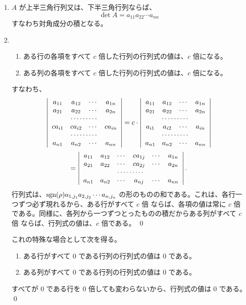 \begin{enumerate}
\item $A$ が上半三角行列又は、下半三角行列ならば、
$$\det A = a_{11}a_{22}\cdots a_{nn}$$
すなわち対角成分の積となる。

\item \begin{enumerate}
	\item ある行の各項をすべて $c$ 倍した行列の行列式の値は、$c$ 倍になる。
	\item ある列の各項をすべて $c$ 倍した行列の行列式の値は、$c$ 倍になる。
	\end{enumerate}
	すなわち、{\small
	$$\left|\begin{array}{cccc}a_{11} & a_{12} & \cdots & a_{1n} \\
a_{21} & a_{22} & \cdots & a_{2n}\\
\multicolumn{4}{c}{\cdots\cdots\cdots}\\
ca_{i1} & ca_{i2} & \cdots & ca_{in}\\
\multicolumn{4}{c}{\cdots\cdots\cdots}\\
a_{n1} & a_{n2} & \cdots & a_{nn}
\end{array}\right| = 
c\cdot\left|\begin{array}{cccc}a_{11} & a_{12} & \cdots & a_{1n} \\
a_{21} & a_{22} & \cdots & a_{2n}\\
\multicolumn{4}{c}{\cdots\cdots\cdots}\\
a_{i1} & a_{i2} & \cdots & a_{in}\\
\multicolumn{4}{c}{\cdots\cdots\cdots}\\
a_{n1} & a_{n2} & \cdots & a_{nn}
\end{array}\right|$$
$$ = \left|\begin{array}{cccccc}a_{11} & a_{12} & \cdots & ca_{1j} & \cdots & a_{1n} \\
a_{21} & a_{22} &  \cdots & ca_{2j} & \cdots & a_{2n} \\
\multicolumn{6}{c}{\cdots\cdots\cdots}\\
a_{n1} & a_{n2} & \cdots & a_{nj} & \cdots & a_{nn}
\end{array}\right|.$$
}%
	\proof
	行列式は、$\mbox{{\rm sgn}}(\rho)a_{1,j_1}a_{2,j_2}\cdots a_{n,j_n}$ の形のものの和である。これは、各行一つずつ必ず現れるから、ある行がすべて $c$ 倍 ならば、各項の値は常に $c$ 倍 である。同様に、各列から一つずつとったものの積だからある列がすべて $c$ 倍  ならば、行列式の値は、$c$ 倍である。
	\qed

\smallskip
これの特殊な場合として次を得る。
	\begin{enumerate}
	\item ある行がすべて 0 である行列の行列式の値は 0 である。
	\item ある列がすべて 0 である行列の行列式の値は 0 である。
	\end{enumerate}
	\proof
	すべてが 0  である行を 0 倍しても変わらないから、行列式の値は 0 である。
	\qed


\end{enumerate}

